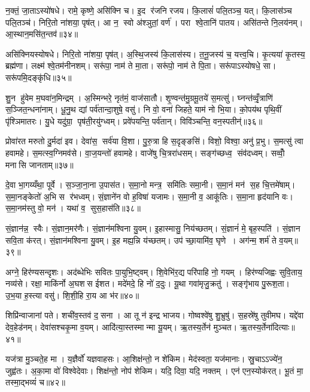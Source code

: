 न॒क्तं॒ जा॒ताऽस्यो॑षधे। रामे॒ कृष्णे॒ असि॑क्नि च। इ॒द र॑जनि रजय। कि॒लासं॑ पलि॒तञ्च॒ यत्। कि॒लास॑ञ्च पलि॒तञ्च॑। निरि॒तो ना॑शया॒ पृष॑त्। आ न॒ स्वो अ॑श्ञुतां॒ वर्ण॑। परा श्वे॒तानि॑ पातय। असि॑तन्ते नि॒लय॑नम्। आ॒स्थान॒मसि॑त॒न्तव॑॥३४॥

असि॑क्नियस्योषधे। निरि॒तो ना॑शया॒ पृष॑त्। अ॒स्थि॒जस्य॑ कि॒लास॑स्य। त॒नू॒जस्य॑ च॒ यत्त्व॒चि। कृ॒त्यया॑ कृ॒तस्य॒ ब्रह्म॑णा। लक्ष्म॑ श्वे॒तम॑नीनशम्। सरू॑पा॒ नाम॑ ते मा॒ता। सरू॑पो॒ नाम॑ ते पि॒ता। सरू॑पाऽस्योषधे॒ सा। सरू॑पमि॒दङ्कृ॑धि॥३५॥

शु॒न हु॑वेम म॒घवा॑न॒मिन्द्रम्। अ॒स्मिन्भरे॒ नृत॑मं॒ वाज॑सातौ। शृ॒ण्वन्त॑मु॒ग्रमू॒तये॑ स॒मत्सु॑। घ्नन्त॑व्वृँ॒त्राणि॑ स॒ञ्जित॒न्धना॑नाम्। धू॒नु॒थ द्यां पर्व॑तान्दा॒शुषे॒ वसु॑। नि वो॒ वना॑ जिहते॒ याम॑ नो भि॒या। को॒पय॑थ पृथि॒वीं पृ॑श्ञिमातरः। यु॒धे यदु॑ग्रा॒ पृष॑ती॒रयु॑ग्ध्वम्। प्रवे॑पयन्ति॒ पर्व॑तान्। विवि॑ञ्चन्ति॒ वन॒स्पतीन्॑॥३६॥

प्रोवा॑रत मरुतो दु॒र्मदा॑ इव। देवा॑स॒ सर्व॑या वि॒शा। पु॒रु॒त्रा हि स॒दृङ्ङसि॑। विशो॒ विश्वा॒ अनु॑ प्र॒भु। स॒मत्सु॑ त्वा हवामहे। स॒मत्स्व॒ग्निमव॑से। वा॒ज॒यन्तो॑ हवामहे। वाजे॑षु चि॒त्ररा॑धसम्। सङ्ग॑च्छध्व॒ संव॑दध्वम्। सव्वोँ॒ मनासि जानताम्॥३७॥

दे॒वा भा॒गय्यँथा॒ पूर्वे। स॒ञ्जा॒ना॒ना उ॒पास॑त। स॒मा॒नो मन्त्र॒ समि॑तिः समा॒नी। स॒मा॒नं मन॑ स॒ह चि॒त्तमे॑षाम्। स॒मा॒नङ्केतो॑ अ॒भि स र॑भध्वम्। सं॒ज्ञाने॑न वो ह॒विषा॑ यजामः। स॒मा॒नी व॒ आकू॑तिः। स॒मा॒ना हृद॑यानि वः। स॒मा॒नम॑स्तु वो॒ मन॑। यथा॑ व॒ सुस॒हास॑ति॥३८॥

सं॒ज्ञान॑न्न॒ स्वैः। सं॒ज्ञान॒मर॑णैः। सं॒ज्ञान॑मश्विना यु॒वम्। इ॒हास्मासु॒ निय॑च्छतम्। सं॒ज्ञानं॑ मे॒ बृह॒स्पति॑। सं॒ज्ञान सवि॒ता क॑रत्। सं॒ज्ञान॑मश्विना यु॒वम्। इ॒ह मह्य॒न्नि य॑च्छतम्। उप॑ च्छा॒यामि॑व॒ घृणे। अग॑न्म॒ शर्म॑ ते व॒यम्॥३९॥

अग्ने॒ हिर॑ण्यसन्दृशः। अद॑ब्धेभिः सवितः पा॒युभि॒ष्ट्वम्। शि॒वेभि॑र॒द्य परि॑पाहि नो॒ गयम्। हिर॑ण्यजिह्वः सुवि॒ताय॒ नव्य॑से। रक्षा॒ माकि॑र्नो अ॒घशस ईशत। मदे॑मदे॒ हि नो॑ द॒दुः। यू॒था गवा॑मृजु॒क्रतु॑। सङ्गृ॑भाय पु॒रूश॒ता। उ॒भ॒या ह॒स्त्या वसु॑। शि॒शी॒हि रा॒य आ भ॑र॥४०॥

शिप्रि॑न्वाजानां पते। शची॑व॒स्तव॑ द॒सना। आ तू न॑ इन्द्र भाजय। गोष्वश्वे॑षु शु॒भ्रुषु॑। स॒हस्रे॑षु तुवीमघ। यद्दे॑वा देव॒हेड॑नम्। देवा॑सश्चकृ॒मा व॒यम्। आदि॑त्या॒स्तस्मान्मा यू॒यम्। ऋ॒तस्य॒र्तेन॑ मुञ्चत। ऋ॒तस्य॒र्तेना॑दित्याः॥४१॥

यज॑त्रा मु॒ञ्चते॒ह मा। य॒ज्ञैर्वो॑ यज्ञवाहसः। आ॒शिक्ष॑न्तो॒ न शे॑किम। मेद॑स्वता॒ यज॑मानाः। स्रु॒चाऽऽज्ये॑न॒ जुह्व॑तः। अ॒का॒मा वो॑ विश्वेदेवाः। शिक्ष॑न्तो॒ नोप॑ शेकिम। यदि॒ दिवा॒ यदि॒ नक्तम्। एन॑ एन॒स्योक॑रत्। भू॒तं मा॒ तस्मा॒द्भव्यं॑ च॥४२॥

